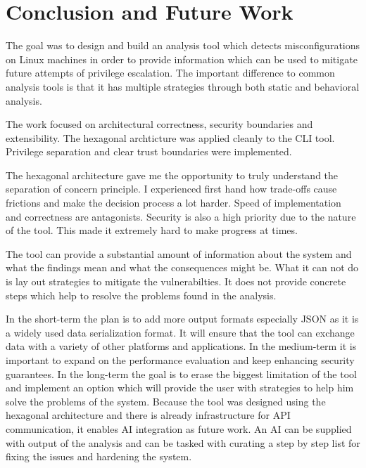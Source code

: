 \section{Conclusion and Future Work}

The goal was to design and build an analysis tool which detects misconfigurations on Linux machines in order to provide information which can be used to mitigate future attempts of privilege escalation. The important difference to common analysis tools is that it has multiple strategies through both static and behavioral analysis. \newline 

The work focused on architectural correctness, security boundaries and extensibility. The hexagonal archticture was applied cleanly to the CLI tool. Privilege separation and clear trust boundaries were implemented. \newline 

The hexagonal architecture gave me the opportunity to truly understand the separation of concern principle. I experienced first hand how trade-offs cause frictions and make the decision process a lot harder. Speed of implementation and correctness are antagonists. Security is also a high priority due to the nature of the tool. This made it extremely hard to make progress at times.\newline

The tool can provide a substantial amount of information about the system and what the findings mean and what the consequences might be. What it can not do is lay out strategies to mitigate the vulnerabilties. It does not provide concrete steps which help to resolve the problems found in the analysis.\newline

In the short-term the plan is to add more output formats especially JSON as it is a widely used data serialization format. It will ensure that the tool can exchange data with a variety of other platforms and applications. In the medium-term it is important to expand on the performance evaluation and keep enhancing security guarantees. In the long-term the goal is to erase the biggest limitation of the tool and implement an option which will provide the user with strategies to help him solve the problems of the system. Because the tool was designed using the hexagonal architecture and there is already infrastructure for API communication, it enables AI integration as future work. An AI can be supplied with output of the analysis and can be tasked with curating a step by step list for fixing the issues and hardening the system.\newline

